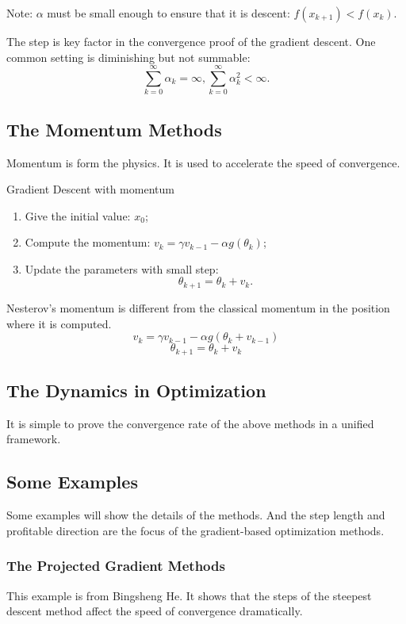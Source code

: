\documentclass[11pt]{article} %
\begin{document}
Note: $\alpha$ must be small enough to ensure that it is descent: $f(x_{k+1})< f(x_{k})$.

The step is key factor in the convergence proof of the gradient descent.
One common setting is diminishing but not summable: $$\sum_{k=0}^{\infty} {\alpha}_{k}= \infty,\sum_{k=0}^{\infty} {\alpha}_{k}^{2}< \infty. $$

\subsection{The Momentum Methods}
Momentum is form the physics.
It is used to accelerate the speed of convergence.
\begin{algorithm}[htbp]
\caption{Gradient Descent with momentum}
\label{momentum}
\begin{enumerate}
\item Give the initial value: $x_0$;
\item Compute the momentum: $v_k= \gamma  v_{k-1} -\alpha g({\theta}_k)$;
\item Update the parameters with small step: $${\theta}_{k+1}={\theta}_k + v_k .$$
\end{enumerate}

\end{algorithm}

Nesterov's momentum is different from the classical momentum in the position where it is computed.
$$v_k= \gamma  v_{k-1}-\alpha g({\theta}_k+v_{k-1})$$
$${\theta}_{k+1}={\theta}_k + v_k$$


\subsection{The Dynamics in Optimization}
It is simple to prove the convergence rate of the above methods in a unified framework.

\subsection{Some Examples}
Some examples will show the details of the methods.
And the step length and profitable direction are the focus of the gradient-based optimization methods.

\subsubsection{The Projected Gradient Methods}
This example is from Bingsheng He. %
It shows that the steps  of the steepest descent method affect the speed of convergence dramatically.
\end{document}
